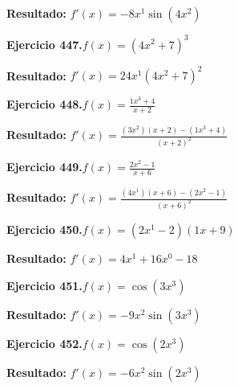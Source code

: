 \documentclass[10pt,a4paper]{article}
\begin{document}
\begin{solbox}
\textbf{Resultado:} \(\displaystyle f'(x) = -8x^{1}\sin(4x^{2})\)
\end{solbox}

\begin{ejbox}
\textbf{Ejercicio 447.}\quad $f(x) = (4x^{2} +7)^{3}$
\end{ejbox}

\begin{solbox}
\textbf{Resultado:} \(\displaystyle f'(x) = 24x^{1}(4x^{2} +7)^{2}\)
\end{solbox}

\newpage
\begin{ejbox}
\textbf{Ejercicio 448.}\quad $f(x) = \frac{1x^{3} +4}{x + 2}$
\end{ejbox}

\begin{solbox}
\textbf{Resultado:} \(\displaystyle f'(x) = \frac{(3x^{2})(x+2) - (1x^{3} +4)}{(x+2)^2}\)
\end{solbox}

\begin{ejbox}
\textbf{Ejercicio 449.}\quad $f(x) = \frac{2x^{2} -1}{x + 6}$
\end{ejbox}

\begin{solbox}
\textbf{Resultado:} \(\displaystyle f'(x) = \frac{(4x^{1})(x+6) - (2x^{2} -1)}{(x+6)^2}\)
\end{solbox}

\begin{ejbox}
\textbf{Ejercicio 450.}\quad $f(x) = (2x^{1} -2)(1x +9)$
\end{ejbox}

\begin{solbox}
\textbf{Resultado:} \(\displaystyle f'(x) = 4x^{1} +16x^{0} -18\)
\end{solbox}

\newpage
\begin{ejbox}
\textbf{Ejercicio 451.}\quad $f(x) = \cos(3x^{3})$
\end{ejbox}

\begin{solbox}
\textbf{Resultado:} \(\displaystyle f'(x) = -9x^{2}\sin(3x^{3})\)
\end{solbox}

\begin{ejbox}
\textbf{Ejercicio 452.}\quad $f(x) = \cos(2x^{3})$
\end{ejbox}

\begin{solbox}
\textbf{Resultado:} \(\displaystyle f'(x) = -6x^{2}\sin(2x^{3})\)
\end{solbox}
\end{document}
